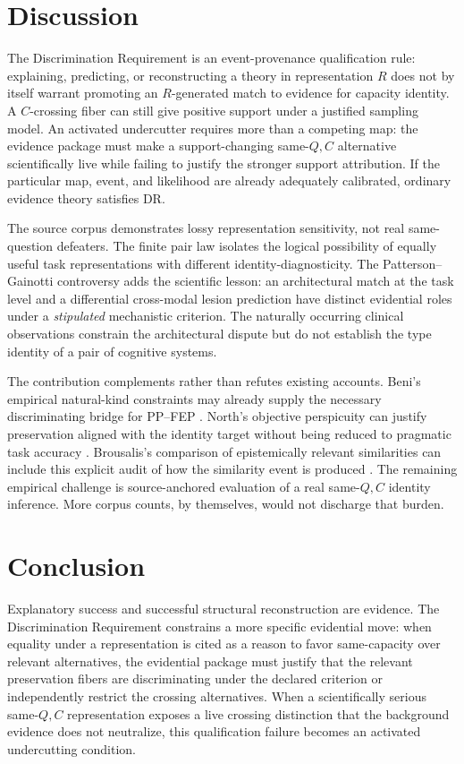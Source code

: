 \documentclass[11pt]{article}
\begin{document}
\section{Discussion}

The Discrimination Requirement is an event-provenance qualification rule: explaining, predicting, or reconstructing a theory in representation \(R\) does not by itself warrant promoting an \(R\)-generated match to evidence for capacity identity. A \(C\)-crossing fiber can still give positive support under a justified sampling model. An activated undercutter requires more than a competing map: the evidence package must make a support-changing same-\(Q,C\) alternative scientifically live while failing to justify the stronger support attribution. If the particular map, event, and likelihood are already adequately calibrated, ordinary evidence theory satisfies DR.

The source corpus demonstrates lossy representation sensitivity, not real same-question defeaters. The finite pair law isolates the logical possibility of equally useful task representations with different identity-diagnosticity. The Patterson--Gainotti controversy adds the scientific lesson: an architectural match at the task level and a differential cross-modal lesion prediction have distinct evidential roles under a \emph{stipulated} mechanistic criterion. The naturally occurring clinical observations constrain the architectural dispute but do not establish the type identity of a pair of cognitive systems.

The contribution complements rather than refutes existing accounts. Beni's empirical natural-kind constraints may already supply the necessary discriminating bridge for PP--FEP \citep{Beni2026KindsWithoutStructure}. North's objective perspicuity can justify preservation aligned with the identity target without being reduced to pragmatic task accuracy \citep{North2026Perspicuous}. Brousalis's comparison of epistemically relevant similarities can include this explicit audit of how the similarity event is produced \citep{Brousalis2026TheoryComparison}. The remaining empirical challenge is source-anchored evaluation of a real same-\(Q,C\) identity inference. More corpus counts, by themselves, would not discharge that burden.

\section{Conclusion}

Explanatory success and successful structural reconstruction are evidence. The Discrimination Requirement constrains a more specific evidential move: when equality under a representation is cited as a reason to favor same-capacity over relevant alternatives, the evidential package must justify that the relevant preservation fibers are discriminating under the declared criterion or independently restrict the crossing alternatives. When a scientifically serious same-\(Q,C\) representation exposes a live crossing distinction that the background evidence does not neutralize, this qualification failure becomes an activated undercutting condition.
\end{document}
